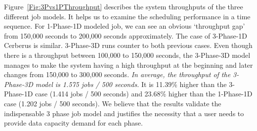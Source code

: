 Figure~\ref{Fig:3Pvs1PThroughput} describes the system throughputs of the three different job models.
It helps us to examine the scheduling performance in a time sequence.
For 1-Phase-1D modeled job, we can see an obvious `throughput gap'
from 150,000 seconds to 200,000 seconds approximately.
The case of 3-Phase-1D Cerberus is similar.
3-Phase-3D runs counter to both previous cases.
Even though there is a throughput between 100,000 to 150,000 seconds,
the 3-Phase-3D model manages to make the system having a high throughput at the beginning and
later changes from 150,000 to 300,000 seconds.
\textit{In average, the throughput of the 3-Phase-3D model is 1.575 jobs / 500 seconds.}
It is 11.39\% higher than the 3-Phase-1D case (1.414 jobs / 500 seconds) and
23.68\% higher than the 1-Phase-1D case (1.202 jobs / 500 seconds).
We believe that the results validate the indispensable 3 phase job model and
justifies the necessity that a user needs to provide data capacity demand for each phase.



